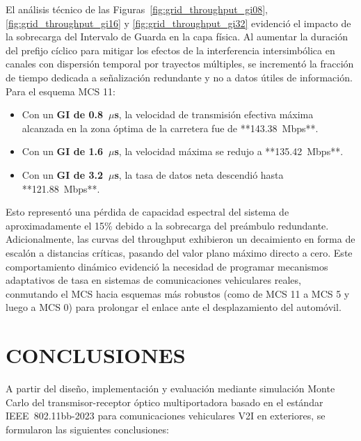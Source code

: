 El análisis técnico de las Figuras~\ref{fig:grid_throughput_gi08}, \ref{fig:grid_throughput_gi16} y \ref{fig:grid_throughput_gi32} evidenció el impacto de la sobrecarga del Intervalo de Guarda en la capa física. Al aumentar la duración del prefijo cíclico para mitigar los efectos de la interferencia intersimbólica en canales con dispersión temporal por trayectos múltiples, se incrementó la fracción de tiempo dedicada a señalización redundante y no a datos útiles de información. Para el esquema MCS 11:
\begin{itemize}
    \item Con un \textbf{GI de 0.8~$\mu$s}, la velocidad de transmisión efectiva máxima alcanzada en la zona óptima de la carretera fue de **143.38~Mbps**.
    \item Con un \textbf{GI de 1.6~$\mu$s}, la velocidad máxima se redujo a **135.42~Mbps**.
    \item Con un \textbf{GI de 3.2~$\mu$s}, la tasa de datos neta descendió hasta **121.88~Mbps**.
\end{itemize}
Esto representó una pérdida de capacidad espectral del sistema de aproximadamente el 15\% debido a la sobrecarga del preámbulo redundante. Adicionalmente, las curvas del throughput exhibieron un decaimiento en forma de escalón a distancias críticas, pasando del valor plano máximo directo a cero. Este comportamiento dinámico evidenció la necesidad de programar mecanismos adaptativos de tasa en sistemas de comunicaciones vehiculares reales, conmutando el MCS hacia esquemas más robustos (como de MCS 11 a MCS 5 y luego a MCS 0) para prolongar el enlace ante el desplazamiento del automóvil.

\section{CONCLUSIONES}

A partir del diseño, implementación y evaluación mediante simulación Monte Carlo del transmisor-receptor óptico multiportadora basado en el estándar IEEE~802.11bb-2023 para comunicaciones vehiculares V2I en exteriores, se formularon las siguientes conclusiones:

